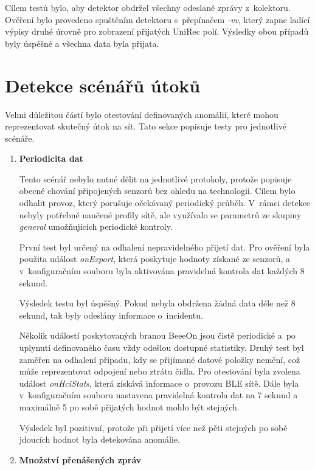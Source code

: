 Cílem testů bylo, aby detektor obdržel všechny odeslané zprávy z~kolektoru. Ověření bylo provedeno
spuštěním detektoru s~přepínačem \textit{-vv}, který zapne ladící výpisy druhé úrovně pro zobrazení 
přijatých UniRec polí. Výsledky obou případů byly úspěšné a všechna data byla přijata.

\section{Detekce scénářů útoků} \label{testAttack}
Velmi důležitou částí bylo otestování definovaných anomálií, které mohou reprezentovat skutečný
útok na sít. Tato sekce popisuje testy pro jednotlivé scénáře.

  \begin{enumerate}
    \item \textbf{Periodicita dat}
    
    Tento scénář nebylo nutné dělit na jednotlivé protokoly, protože popisuje obecné chování 
    připojených senzorů bez ohledu na technologii. Cílem bylo odhalit provoz, který porušuje
    očekávaný periodický průběh. V~rámci detekce nebyly potřebné naučené profily sítě, 
    ale využívalo se parametrů ze skupiny \textit{general} umožňujících periodické kontroly.
    
    První test byl určený na odhalení nepravidelného přijetí dat. Pro ověření byla použita událost
    \textit{onExport}, která poskytuje hodnoty získané ze senzorů, a v~konfiguračním souboru byla 
    aktivována pravidelná kontrola dat každých 8 sekund.
    
    Výsledek testu byl úspěšný. Pokud nebyla obdržena žádná data déle než 8 sekund, tak byly
    odeslány informace o~incidentu.
    
    Několik událostí poskytovaných branou BeeeOn jsou čistě periodické a~po uplynutí definovaného
    času vždy odešlou dostupné statistiky. Druhý test byl zaměřen na odhalení případu, kdy se 
    přijímané datové položky nemění, což může reprezentovat odpojení nebo ztrátu čidla. Pro 
    otestování byla zvolena událost \textit{onHciStats}, která získává informace o~provozu BLE sítě. 
    Dále byla v~konfiguračním souboru nastavena pravidelná kontrola dat na 7 sekund a maximálně 
    5 po sobě přijatých hodnot mohlo být stejných. 
    
    Výsledek byl pozitivní, protože při přijetí více než pěti stejných po sobě jdoucích
    hodnot byla detekována anomálie.
    
    \item \textbf{Množství přenášených zpráv}
    

\end{enumerate}

